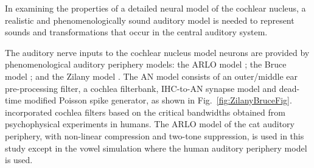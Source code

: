 %

In examining the properties of a detailed neural model of the cochlear nucleus,
a realistic and phenomenologically sound auditory model is needed to represent
sounds and transformations that occur in the central auditory system.

%

 The auditory nerve inputs to the cochlear nucleus model neurons
are provided by phenomenological auditory periphery models: the ARLO model
\citep{HeinzZhangEtAl:2001}; the Bruce model \citep{BruceSachsEtAl:2003,
  ZilanyBruce:2006, ZilanyBruce:2007}; and the Zilany model
\citep{ZilanyBruceEtAl:2009}. The AN model consists of an outer/middle ear
pre-processing filter, a cochlea filterbank, IHC-to-AN synapse model and
dead-time modified Poisson spike generator, as shown in
Fig.~\ref{fig:ZilanyBruceFig}. \citep{HeinzZhangEtAl:2001} incorporated cochlea
filters based on the critical bandwidths obtained from psycho\-physical
experiments in humans. The ARLO model of the cat auditory periphery, with
non-linear compression and two-tone suppression, is used in this study except in
the vowel simulation where the human auditory periphery model is used.







